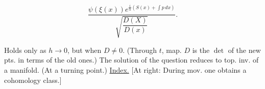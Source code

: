 \par\noindent\begin{minipage}{\linewidth}
\begin{equation*}
\frac{\psi(\xi(x))e^{\frac{i}{h}(S(x)+\int p\,dx)}}{\sqrt{\dfrac{D(X)}{D(x)}}}.
\end{equation*}
\end{minipage}\par
[At right: norm. factor.]
Holds only as $h\longrightarrow0$, but when $D\ne0$.
(Through $t$, map. $D$ is the $\det$ of the new pts. in terms of the old ones.)
The solution of the question reduces to top. inv. of a manifold.
(At a turning point.) \underline{Index.}
[At right: During mov. one obtains a cohomology class.]

